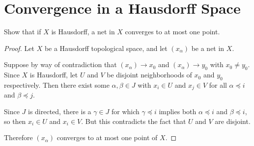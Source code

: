 \documentclass[12pt]{article}
\begin{document}
\section{Convergence in a Hausdorff Space}
Show that if $X$ is Hausdorff, a net in $X$ converges to at most one point.
\begin{proof}
    Let $X$ be a Hausdorff topological space, and let $(x_\alpha)$ be a net in $X$.

    Suppose by way of contradiction that $(x_\alpha) \to x_0$ and $(x_\alpha) \to y_0$ with
    $x_0 \neq y_0$. Since $X$ is Hausdorff, let $U$ and $V$ be disjoint neighborhoods of
    $x_0$ and $y_0$ respectively. Then there exist some $\alpha, \beta \in J$ with
    $x_i \in U$ and $x_j \in V$ for all $\alpha \preceq i$ and $\beta \preceq j$.

    Since $J$ is directed, there is a $\gamma \in J$ for which $\gamma \preceq i$ implies both
    $\alpha \preceq i$ and $\beta \preceq i$, so then $x_i \in U$ and $x_i \in V$. But this
    contradicts the fact that $U$ and $V$ are disjoint.

    Therefore $(x_\alpha)$ converges to at most one point of $X$.
\end{proof}
\end{document}
